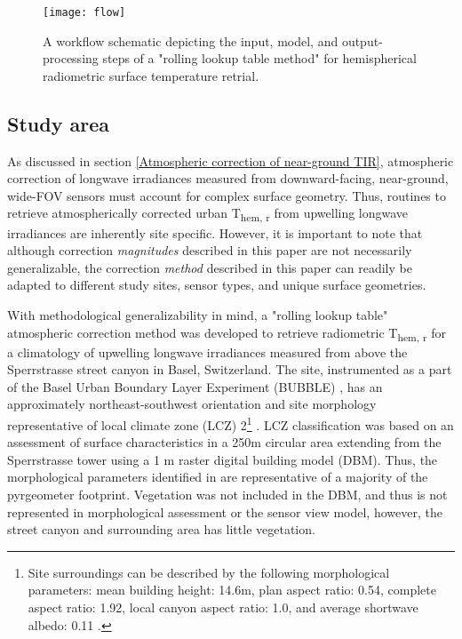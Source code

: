 \begin{figure}[!ht]
	\texttt{[image: flow]}
	\caption{A workflow schematic depicting the input, model, and output-processing steps of a "rolling lookup table method" for hemispherical radiometric surface temperature retrial.}
	\label{flow}
\end{figure}

\subsection{Study area}

As discussed in section \ref{Atmospheric correction of near-ground TIR}, atmospheric correction of longwave irradiances measured from downward-facing, near-ground, wide-FOV sensors must account for complex surface geometry. Thus, routines to retrieve atmospherically corrected urban T\textsubscript{hem, r} from upwelling longwave irradiances are inherently site specific. However, it is important to note that although correction \textit{magnitudes} described in this paper are not necessarily generalizable, the correction \textit{method} described in this paper can readily be adapted to different study sites, sensor types, and unique surface geometries.

With methodological generalizability in mind, a "rolling lookup table" atmospheric correction method was developed to retrieve radiometric T\textsubscript{hem, r} for a climatology of upwelling longwave irradiances measured from above the Sperrstrasse street canyon in Basel, Switzerland. The site, instrumented as a part of the Basel Urban Boundary Layer Experiment (BUBBLE) \cite{Rotach2005}, has an approximately northeast-southwest orientation and site morphology representative of local climate zone (LCZ) 2\footnote{Site surroundings can be described by the following morphological parameters: mean building height: 14.6m, plan aspect ratio: 0.54, complete aspect ratio: 1.92, local canyon aspect ratio: 1.0, and average shortwave albedo: 0.11 \cite{Rotach2005}.} \cite{Stewart2012}. LCZ classification was based on an assessment of surface characteristics in a 250m circular area extending from the Sperrstrasse tower using a 1 \si{m} raster digital building model (DBM). Thus, the morphological parameters identified in \cite{Rotach2005} are representative of a majority of the pyrgeometer footprint. Vegetation was not included in the DBM, and thus is not represented in morphological assessment or the sensor view model, however, the street canyon and surrounding area has little vegetation.

